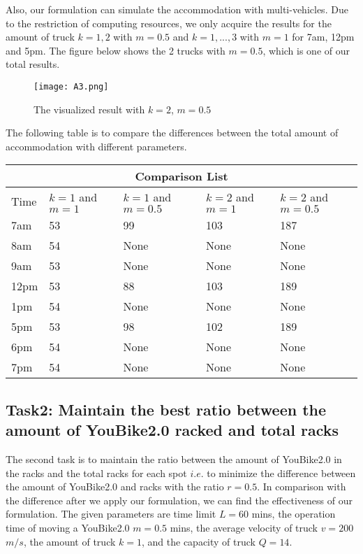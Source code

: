 \documentclass[12pt,a4paper]{article}
\begin{document}
Also, our formulation can simulate the accommodation with multi-vehicles. Due to the restriction of computing resources, we only acquire the results for the amount of truck $k=1,2$ with $m=0.5$ and $k=1,...,3$ with $m=1$ for 7am, 12pm and 5pm. The figure below shows the 2 trucks with $m=0.5$, which is one of our total results.
\begin{figure}[htp]
    \centering
    \texttt{[image: A3.png]}
    \caption{The visualized result with $k=2$, $m=0.5$}
    \label{fig:galaxy}
\end{figure}

The following table is to compare the differences between the total amount of accommodation with different parameters.

\begin{center}
\begin{tabular}{ |p{1cm}|p{1.5cm}|p{1.5cm}|p{1.5cm}|p{1.5cm}|    }
\hline
\multicolumn{5}{|c|}{Comparison List} \\
\hline
Time& $k=1$ and $m=1$ & $k=1$ and $m=0.5$ & $k=2$ and $m=1$ & $k=2$ and $m=0.5$ \\
\hline
7am & 53 & 99 & 103 & 187 \\
8am & 54 & None & None & None \\
9am & 53 & None & None & None \\
12pm & 53 & 88 & 103 & 189 \\
1pm & 54 & None & None & None \\
5pm & 53 & 98 & 102 & 189 \\
6pm & 54 & None & None & None \\
7pm & 54 & None & None & None \\
\hline
\end{tabular}
\end{center}

\subsection{Task2: Maintain the best ratio between the amount of YouBike2.0 racked and total racks} %
The second task is to maintain the ratio between the amount of YouBike2.0 in the racks and the total racks for each spot $i.e.$ to minimize the difference between the amount of YouBike2.0 and racks with the ratio $r=0.5$. In comparison with the difference after we apply our formulation, we can find the effectiveness of our formulation. The given parameters are time limit $L=60$ mins, the operation time of moving a YouBike2.0 $m=0.5$ mins, the average velocity of truck $v=200$ $m/s$, the amount of truck $k=1$, and the capacity of truck $Q=14$.
\end{document}

